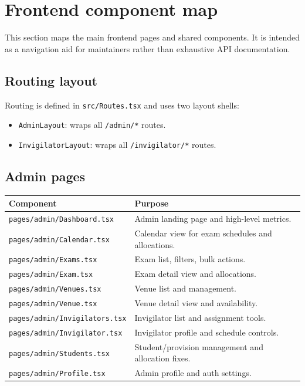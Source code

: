 \section{Frontend component map}
\label{sec:frontend:components}

This section maps the main frontend pages and shared components. It is intended as a navigation aid for maintainers rather than exhaustive API documentation.

\subsection{Routing layout}
\label{subsec:frontend:components:routing}

Routing is defined in \texttt{src/Routes.tsx} and uses two layout shells:

\begin{itemize}
  \item \texttt{AdminLayout}: wraps all \texttt{/admin/*} routes.
  \item \texttt{InvigilatorLayout}: wraps all \texttt{/invigilator/*} routes.
\end{itemize}

\subsection{Admin pages}
\label{subsec:frontend:components:adminpages}

\begin{longtable}{p{}p{}}
\toprule
\textbf{Component} & \textbf{Purpose} \\
\midrule
\texttt{pages/admin/Dashboard.tsx} & Admin landing page and high-level metrics. \\
\texttt{pages/admin/Calendar.tsx} & Calendar view for exam schedules and allocations. \\
\texttt{pages/admin/Exams.tsx} & Exam list, filters, bulk actions. \\
\texttt{pages/admin/Exam.tsx} & Exam detail view and allocations. \\
\texttt{pages/admin/Venues.tsx} & Venue list and management. \\
\texttt{pages/admin/Venue.tsx} & Venue detail view and availability. \\
\texttt{pages/admin/Invigilators.tsx} & Invigilator list and assignment tools. \\
\texttt{pages/admin/Invigilator.tsx} & Invigilator profile and schedule controls. \\
\texttt{pages/admin/Students.tsx} & Student/provision management and allocation fixes. \\
\texttt{pages/admin/Profile.tsx} & Admin profile and auth settings. \\
\bottomrule
\end{longtable}

